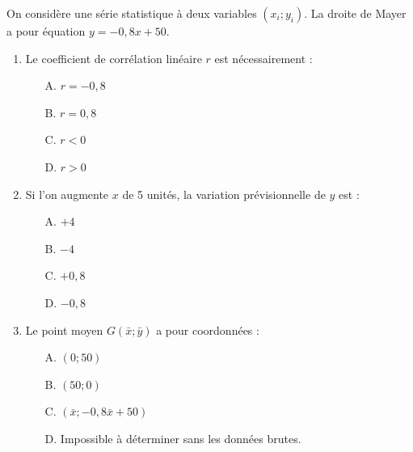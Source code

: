 \documentclass[11pt]{article}
\begin{document}
\begin{exercice}
On considère une série statistique à deux variables $(x_i ; y_i)$. La droite de Mayer a pour équation $y = -0,8x + 50$.
\begin{enumerate}
    \item Le coefficient de corrélation linéaire $r$ est nécessairement :
    \begin{itemize}
        \item[A.] $r = -0,8$
        \item[B.] $r = 0,8$
        \item[C.] $r < 0$
        \item[D.] $r > 0$
    \end{itemize}
    \item Si l'on augmente $x$ de 5 unités, la variation prévisionnelle de $y$ est :
    \begin{itemize}
        \item[A.] $+4$
        \item[B.] $-4$
        \item[C.] $+0,8$
        \item[D.] $-0,8$
    \end{itemize}
    \item Le point moyen $G(\bar{x} ; \bar{y})$ a pour coordonnées :
    \begin{itemize}
        \item[A.] $(0 ; 50)$
        \item[B.] $(50 ; 0)$
        \item[C.] $(\bar{x} ; -0,8\bar{x} + 50)$
        \item[D.] Impossible à déterminer sans les données brutes.
    \end{itemize}
\end{enumerate}
\end{exercice}
\end{document}
